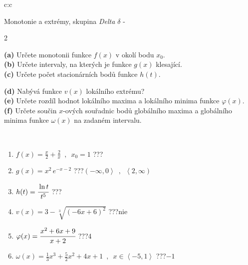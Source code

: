 \documentclass[10pt]{report}
\begin{document}
\newpage
\thispagestyle{empty}
\begin{tabular}{c:c}
\begin{minipage}[c][104.5mm][t]{0.5\linewidth}
\begin{center}
\vspace{7mm}
{\huge Monotonie a extrémy, skupina \textit{Delta $\delta$} -}\\[5mm]
\begin{minipage}{0.95\linewidth}
\begin{center}
{\small \begin{multicols}{2} \raggedright
\textbf{(a)} Určete monotonii funkce \(f(x)\) v okolí bodu \(x_0\). \\[1mm]
\textbf{(b)} Určete intervaly, na kterých je funkce \(g(x)\) klesající. \\[1mm]
\textbf{(c)} Určete počet stacionárních bodů funkce \(h(t)\). \par \columnbreak
\textbf{(d)} Nabývá funkce \(v(x)\) lokálního extrému? \\[1mm]
\textbf{(e)} Určete rozdíl hodnot lokálního maxima a lokálního minima funkce \(\varphi(x)\). \\[1mm]
\textbf{(f)} Určete součin \(x\)-ových souřadnic bodů globálního maxima a globálního minima funkce \(\omega(x)\) na zadaném intervalu. \\[1mm]
\end{multicols}
}
\end{center}
\end{minipage}
\\[4mm]
\begin{minipage}{0.79\linewidth}
\begin{center}
\begin{varwidth}{\linewidth}
\begin{enumerate}
\normalsize
\item $f(x)=\frac{x}{2}+\frac{2}{x} \enspace , \enspace x_0=1$\quad \dotfill\; ???\;\dotfill \quad {}
\item $g(x)=x^2\, e^{-x-2}$\quad \dotfill\; ???\;\dotfill \quad $\left(-\infty , 0\right\rangle\enspace , \enspace \left\langle2 , \infty\right)$
\item $h(t)=\cfrac{\ln t}{t^5}$\quad \dotfill\; ???\;\dotfill {}
\item $v(x)=3-\sqrt[3]{(-6x+6)^2}$\quad \dotfill\; ???\;\dotfill \quad $\text{nie}$
\item $\varphi(x)=\cfrac{x^2+6x+9}{x+2}$\quad \dotfill\; ???\;\dotfill \quad $4$
\item $\omega(x)=\frac{1}{3}x^3+\frac{5}{2}x^2+4x+1 \enspace , \enspace x\in\left\langle-5 , 1\right\rangle$\quad \dotfill\; ???\;\dotfill \quad $-1$

\end{enumerate}
\end{varwidth}
\end{center}
\end{minipage}
\end{center}
\end{minipage}
\end{tabular}
\end{document}
